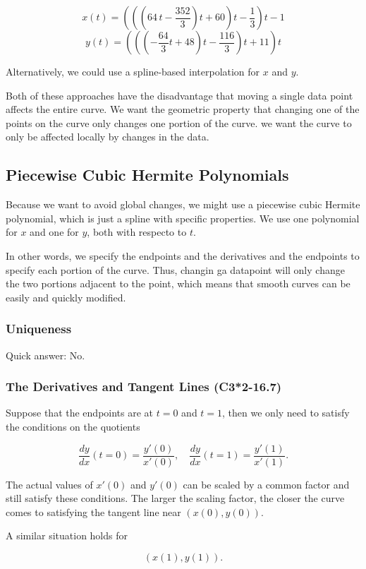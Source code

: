 \[
x(t) = \left(\left(\left(64\,t - \frac{352}{3}\right)t + 60\right)t - \frac{1}{3}\right)t - 1
\]
\[
y(t) = \left(\left(\left(-\frac{64}{3}t + 48\right)t - \frac{116}{3}\right)t + 11\right)t
\] 

Alternatively, we could use a spline-based interpolation for $x$ and $y$.

Both of these approaches have the disadvantage that moving a single data point
affects the entire curve. We want the geometric property that changing one of
the points on the curve only changes one portion of the curve. \ie we want the
curve to only be affected locally by changes in the data.

\subsection{Piecewise Cubic Hermite Polynomials}
Because we want to avoid global changes, we might use a piecewise cubic Hermite
polynomial, which is just a spline with specific properties. We use one
polynomial for $x$ and one for $y$, both with respecto to $t$.

In other words, we specify the endpoints and the derivatives and the endpoints
to specify each portion of the curve. Thus, changin ga datapoint will only
change the two portions adjacent to the point, which means that smooth curves
can be easily and quickly modified.

\subsubsection{Uniqueness}

Quick answer: No.

\subsubsection{The Derivatives and Tangent Lines (C3*2-16.7)}
Suppose that the endpoints are at $t=0$ and $t=1$, then we only need to satisfy
the conditions on the quotients

\[
\frac{dy}{dx} (t=0) = \frac{y'(0)}{x'(0)}, \quad \frac{dy}{dx} (t=1)
= \frac{y'(1)}{x'(1)}
.\]

The actual values of $x'(0)$ and $y'(0)$ can be scaled by a common factor and
still satisfy these conditions. The larger the scaling factor, the closer the
curve comes to satisfying the tangent line near $(x(0), y(0))$.

A similar situation holds for 

\[
  (x(1), y(1))
.\]

